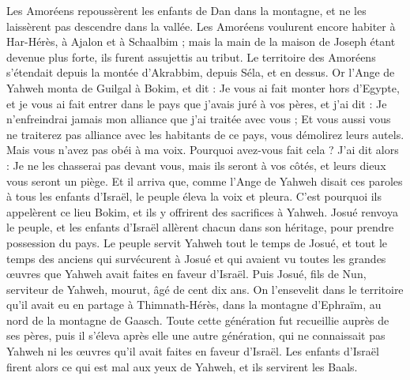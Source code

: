 \begin{multicols}{2}
Les Amoréens repoussèrent les enfants de Dan dans la montagne, et ne les laissèrent pas descendre dans la vallée.
Les Amoréens voulurent encore habiter à Har-Hérès, à Ajalon et à Schaalbim ; mais la main de la maison de Joseph étant devenue plus forte, ils furent assujettis au tribut.
Le territoire des Amoréens s'étendait depuis la montée d’Akrabbim, depuis Séla, et en dessus.
\VerseOne{}Or l'Ange de Yahweh monta de Guilgal à Bokim, et dit : Je vous ai fait monter hors d'Egypte, et je vous ai fait entrer dans le pays que j’avais juré à vos pères, et j’ai dit : Je n’enfreindrai jamais mon alliance que j’ai traitée avec vous ;
Et vous aussi vous ne traiterez pas alliance avec les habitants de ce pays, vous démolirez leurs autels. Mais vous n'avez pas obéi à ma voix. Pourquoi avez-vous fait cela ?
J’ai dit alors : Je ne les chasserai pas devant vous, mais ils seront à vos côtés, et leurs dieux vous seront un piège.
Et il arriva que, comme l'Ange de Yahweh disait ces paroles à tous les enfants d'Israël, le peuple éleva la voix et pleura.
C'est pourquoi ils appelèrent ce lieu Bokim, et ils y offrirent des sacrifices à Yahweh.
Josué renvoya le peuple, et les enfants d'Israël allèrent chacun dans son héritage, pour prendre possession du pays.
Le peuple servit Yahweh tout le temps de Josué, et tout le temps des anciens qui survécurent à Josué et qui avaient vu toutes les grandes œuvres que Yahweh avait faites en faveur d’Israël.
Puis Josué, fils de Nun, serviteur de Yahweh, mourut, âgé de cent dix ans.
On l’ensevelit dans le territoire qu’il avait eu en partage à Thimnath-Hérès, dans la montagne d'Ephraïm, au nord de la montagne de Gaasch.
Toute cette génération fut recueillie auprès de ses pères, puis il s’éleva après elle une autre génération, qui ne connaissait pas Yahweh ni les œuvres qu'il avait faites en faveur d’Israël.
Les enfants d'Israël firent alors ce qui est mal aux yeux de Yahweh, et ils servirent les Baals.

\end{multicols}
